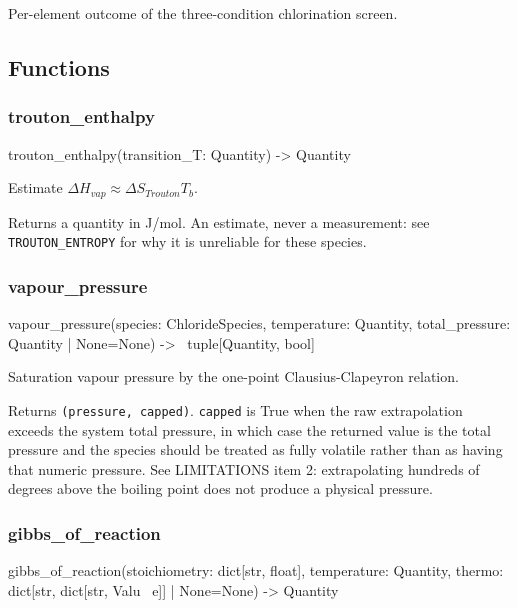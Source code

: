 \documentclass[10pt,a4paper,twoside]{report}
\begin{document}
Per-element outcome of the three-condition chlorination screen.

\subsection*{Functions}

\subsubsection*{trouton\_enthalpy}

\begin{verbatimsmall}
trouton_enthalpy(transition_T: Quantity) -> Quantity
\end{verbatimsmall}

Estimate $\Delta H_{vap} \approx \Delta S_{Trouton} T_b$.

Returns a quantity in J/mol. An estimate, never a measurement: see \texttt{TROUTON\_ENTROPY} for why it is unreliable for these species.

\subsubsection*{vapour\_pressure}

\begin{verbatimsmall}
vapour_pressure(species: ChlorideSpecies, temperature: Quantity, total_pressure: Quantity | None=None) -> 
    \ tuple[Quantity, bool]
\end{verbatimsmall}

Saturation vapour pressure by the one-point Clausius-Clapeyron relation.

Returns \texttt{(pressure, capped)}. \texttt{capped} is True when the raw extrapolation exceeds the system total pressure, in which case the returned value is the total pressure and the species should be treated as fully volatile rather than as having that numeric pressure. See LIMITATIONS item 2: extrapolating hundreds of degrees above the boiling point does not produce a physical pressure.

\subsubsection*{gibbs\_of\_reaction}

\begin{verbatimsmall}
gibbs_of_reaction(stoichiometry: dict[str, float], temperature: Quantity, thermo: dict[str, dict[str, Valu
    \ e]] | None=None) -> Quantity
\end{verbatimsmall}
\end{document}
